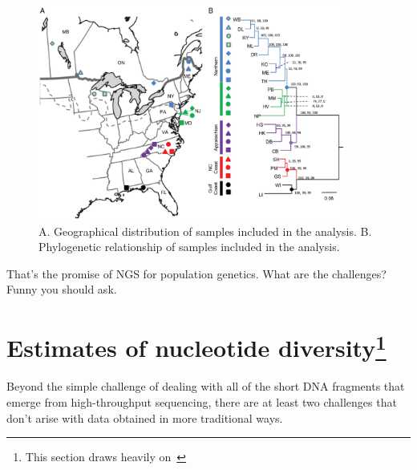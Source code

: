 \documentclass[12pt]{article}
\begin{document}
\begin{figure}
\begin{center}
\includegraphics[width=0.9\textwidth]{wyeomyia-RAD.eps}
\end{center}
\caption{A. Geographical distribution of samples included in the
  analysis. B. Phylogenetic relationship of samples included in the analysis.}\label{fig:wyeomyia-RAD}
\end{figure}

That's the promise of NGS for population genetics. What are the
challenges? Funny you should ask.

\section*{Estimates of nucleotide diversity\footnote{This section draws heavily on~\cite{Lynch-2008}}}

Beyond the simple challenge of dealing with all of the short DNA
fragments that emerge from high-throughput sequencing, there are at
least two challenges that don't arise with data obtained in more
traditional ways.
\end{document}
